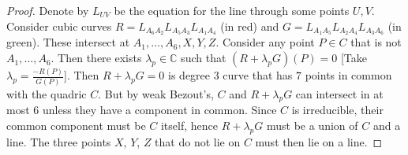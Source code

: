\documentclass[12pt]{article}
\newcommand{\C}{\mathbb{C}}
\begin{document}
    \begin{proof}
        Denote by $L_{UV}$ be the equation for the line through some points $U, V$. Consider cubic curves $R = L_{A_6A_2}L_{A_5A_3}L_{A_1A_4}$ (in red) and $G = L_{A_1A_5}L_{A_2A_4}L_{A_3A_6}$ (in green). These intersect at $A_1, \dots, A_6, X, Y, Z$. Consider any point $P \in C$ that is not $A_1, \dots, A_6$. Then there exists $\lambda_p \in \C$ such that $(R + \lambda_p G)(P) = 0$ [Take $\lambda_p = \frac{-R(P)}{G(P)}$]. Then $R + \lambda_p G = 0$ is degree $3$ curve that has $7$ points in common with the quadric $C$. But by weak Bezout's, $C$ and $R + \lambda_p G$ can intersect in at most $6$ unless they have a component in common. Since $C$ is irreducible, their common component must be $C$ itself, hence $R + \lambda_p G$ must be a union of $C$ and a line. The three points $X$, $Y$, $Z$ that do not lie on $C$ must then lie on a line. 
    \end{proof}
\end{document}
